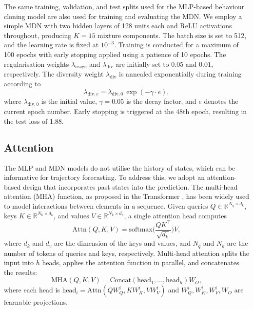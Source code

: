 \documentclass[journal]{IEEEtran}
\begin{document}
The same training, validation, and test splits used for the MLP-based behaviour cloning model are also used for training and evaluating the MDN. We employ a simple MDN with two hidden layers of 128 units each and ReLU activations throughout, producing $K=15$ mixture components. The batch size is set to 512, and the learning rate is fixed at $10^{-3}$. Training is conducted for a maximum of 100 epochs with early stopping applied using a patience of 10 epochs. The regularisation weights $\lambda_{\text{usage}}$ and $\lambda_{\text{div}}$ are initially set to $0.05$ and $0.01$, respectively. The diversity weight $\lambda_{\text{div}}$ is annealed exponentially during training according to
\[
\lambda_{\text{div},e} = \lambda_{\text{div},0} \, \exp(-\gamma \cdot e),
\]
where $\lambda_{\text{div},0}$ is the initial value, $\gamma = 0.05$ is the decay factor, and $e$ denotes the current epoch number. Early stopping is triggered at the 48th epoch, resulting in the test loss of 1.88. 

\subsection{Attention}\label{subsec:attention-highway}
The MLP and MDN models do not utilise the history of states, which can be informative for trajectory forecasting. To address this, we adopt an attention-based design that incorporates past states into the prediction. The multi-head attention (MHA) function, as proposed in the Transformer \cite{vaswani_AttentionAllYou_2017}, has been widely used to model interactions between elements in a sequence. Given queries $Q \in \mathbb{R}^{N_q \times d_k}$, keys $K \in \mathbb{R}^{N_k \times d_k}$, and values $V \in \mathbb{R}^{N_k \times d_v}$, a single attention head computes
\begin{equation}
\text{Attn}(Q,K,V) = \text{softmax}\Big(\frac{Q K^\top}{\sqrt{d_k}}\Big) V,
\end{equation}
where $d_k$ and $d_v$ are the dimension of the keys and values, and $N_q$ and $N_k$ are the number of tokens of queries and keys, respectively. Multi-head attention splits the input into $h$ heads, applies the attention function in parallel, and concatenates the results:
\begin{equation}
\text{MHA}(Q,K,V) = \text{Concat}(\text{head}_1, \dots, \text{head}_h) W_O,
\end{equation}
where each head is $\text{head}_i = \text{Attn}(Q W_Q^i, K W_K^i, V W_V^i)$ and $W_Q^i, W_K^i, W_V^i, W_O$ are learnable projections.
\end{document}
